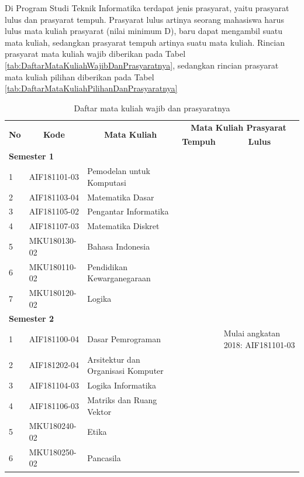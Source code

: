Di Program Studi Teknik Informatika terdapat jenis prasyarat, yaitu prasyarat lulus dan prasyarat tempuh. Prasyarat lulus artinya seorang mahasiswa harus lulus mata kuliah prasyarat (nilai minimum D), baru dapat mengambil suatu mata kuliah, sedangkan prasyarat tempuh artinya suatu mata kuliah. Rincian prasyarat mata kuliah wajib diberikan pada Tabel \ref{tab:DaftarMataKuliahWajibDanPrasyaratnya}, sedangkan rincian prasyarat mata kuliah pilihan diberikan pada Tabel \ref{tab:DaftarMataKuliahPilihanDanPrasyaratnya}

\begin{table}[H]
	\centering
		\caption{Daftar mata kuliah wajib dan prasyaratnya}
		\begin{tabular}{|p{0.5cm}|p{2.85cm}|p{4.95cm}|p{2.7cm}|p{2.7cm}|}
			\hline
			\multicolumn{1}{|c|}{\multirow{2}{*}{\textbf{No}}} & \multicolumn{1}{c|}{\multirow{2}{*}{\textbf{Kode}}} & \multicolumn{1}{c|}{\multirow{2}{*}{\textbf{Mata Kuliah}}} & \multicolumn{2}{c|}{\textbf{Mata Kuliah Prasyarat}} \\ \cline{4-5}
			 &  &  & \multicolumn{1}{c|}{\textbf{Tempuh}} & \multicolumn{1}{c|}{\textbf{Lulus}} \\ \hline
			\multicolumn{5}{|l|}{\textbf{Semester 1}} \\ \hline
1 & AIF181101-03 & Pemodelan untuk Komputasi &  &  \\ \hline
2 & AIF181103-04 & Matematika Dasar &  &  \\ \hline
3 & AIF181105-02 & Pengantar Informatika &  &  \\ \hline
4 & AIF181107-03 & Matematika Diskret &  &  \\ \hline
5 & MKU180130-02 & Bahasa Indonesia &  &  \\ \hline
6 & MKU180110-02 & Pendidikan Kewarganegaraan &  &  \\ \hline
7 & MKU180120-02 & Logika &  &  \\ \hline
\multicolumn{5}{|l|}{\textbf{Semester 2}} \\ \hline
1 & AIF181100-04 & Dasar Pemrograman &  & Mulai angkatan 2018: AIF181101-03 \\ \hline
2 & AIF181202-04 & Arsitektur dan Organisasi Komputer &  &  \\ \hline
3 & AIF181104-03 & Logika Informatika &  &  \\ \hline
4 & AIF181106-03 & Matriks dan Ruang Vektor &  &  \\ \hline
5 & MKU180240-02 & Etika &  &  \\ \hline
6 & MKU180250-02 & Pancasila &  &  \\ \hline

\end{tabular}
\end{table}

